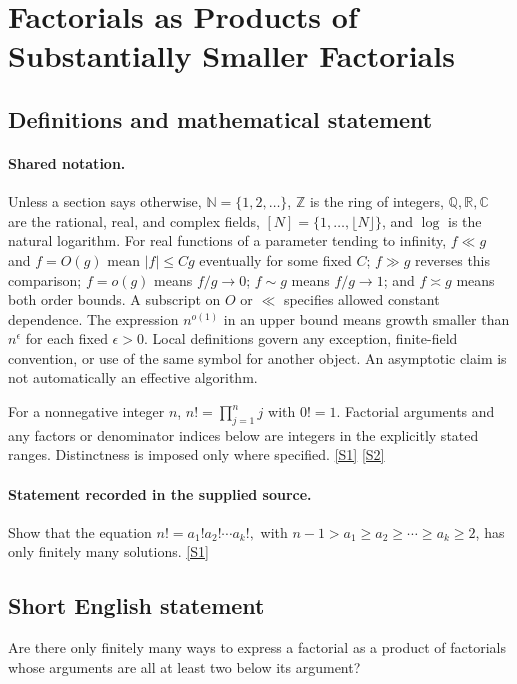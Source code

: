 \documentclass[11pt,a4paper]{article}
\newcommand{\N}{\mathbb{N}}
\newcommand{\Z}{\mathbb{Z}}
\newcommand{\Q}{\mathbb{Q}}
\newcommand{\R}{\mathbb{R}}
\newcommand{\C}{\mathbb{C}}
\newcommand{\sref}[2]{\hyperlink{source:#1:#2}{[S#2]}}
\begin{document}
\section{Factorials as Products of Substantially Smaller Factorials}\label{statement}


\subsection{Definitions and mathematical statement}

\paragraph{Shared notation.}Unless a section says otherwise, $\N=\{1,2,\ldots\}$,
$\Z$ is the ring of integers, $\Q,\R,\C$ are the rational, real, and complex
fields, $[N]=\{1,\ldots,\lfloor N\rfloor\}$, and $\log$ is the natural
logarithm. For real functions of a parameter tending to infinity,
$f\ll g$ and $f=O(g)$ mean $|f|\leq Cg$ eventually for some fixed $C$;
$f\gg g$ reverses this comparison; $f=o(g)$ means $f/g\to0$;
$f\sim g$ means $f/g\to1$; and $f\asymp g$ means both order bounds.
A subscript on $O$ or $\ll$ specifies allowed constant dependence.
The expression $n^{o(1)}$ in an upper bound means growth smaller than
$n^\epsilon$ for each fixed $\epsilon>0$. Local definitions govern any
exception, finite-field convention, or use of the same symbol for another
object. An asymptotic claim is not automatically an effective algorithm.



For a nonnegative integer $n$, $n!=\prod_{j=1}^n j$ with $0!=1$. Factorial arguments and any factors or denominator indices below are integers in the explicitly stated ranges. Distinctness is imposed only where specified. \sref{statement}{1} \sref{statement}{2}

\paragraph{Statement recorded in the supplied source.}
Show that the equation $ n! = a_1!a_2!\cdots a_k!, $ with $n-1>a_1\geq a_2\geq \cdots \geq a_k\geq 2$, has only finitely many solutions. \sref{statement}{1}

\subsection{Short English statement}

Are there only finitely many ways to express a factorial as a product of factorials whose arguments are all at least two below its argument?
\end{document}
